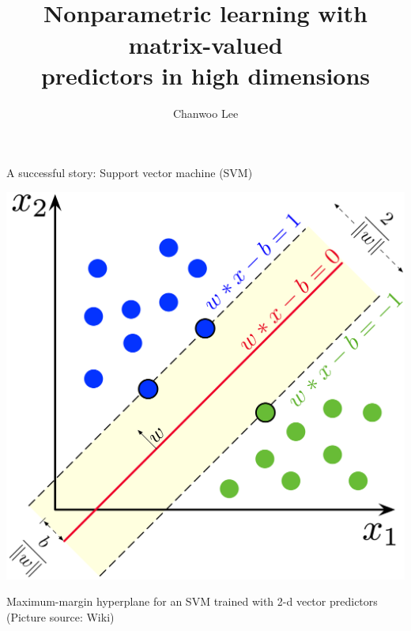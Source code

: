 \documentclass[compress,dvipsnames]{beamer}
\begin{document}
\begin{frame}[plain]

\title[Higher-order tensors]{\\
Nonparametric learning with matrix-valued \\
predictors in high dimensions}
\author{Chanwoo Lee}
\date{}
\titlepage
\end{frame}




\begin{frame}{A successful story: Support vector machine (SVM)}

\centerline{\includegraphics[width=.6\textwidth]{SVM_margin.png}}

Maximum-margin hyperplane for an SVM trained with {\color{red}2-d vector predictors} (Picture source: Wiki)
\end{frame}
\end{document}
